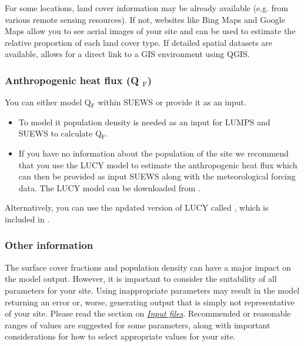 \documentclass[letterpaper,10pt,english]{sphinxmanual}
\begin{document}
For some locations, land cover information may be already available
(e.g. from various remote sensing resources). If not, websites like Bing
Maps and Google Maps allow you to see aerial images of your site and can
be used to estimate the relative proportion of each land cover type. If
detailed spatial datasets are available,
 allows for a direct link
to a GIS environment using QGIS.


\subsubsection{Anthropogenic heat flux (Q $_{\text{F}}$)}
\label{\detokenize{prepare-to-run-the-model:anthropogenic-heat-flux-qf-1}}\label{\detokenize{prepare-to-run-the-model:anthropogenic-heat-flux-q-f}}
You can either model Q$_{\text{F}}$ within SUEWS or provide it as an input.
\begin{itemize}
\item {} 
To model it population density is needed as an input for LUMPS and
SUEWS to calculate Q$_{\text{F}}$.

\item {} 
If you have no information about the population of the site we
recommend that you use the LUCY model \label{\detokenize{prepare-to-run-the-model:id8}}{\hyperref[\detokenize{references:lucy}]{\sphinxcrossref{{[}lucy{]}}}}  \label{\detokenize{prepare-to-run-the-model:id9}}{\hyperref[\detokenize{references:lucy2}]{\sphinxcrossref{{[}lucy2{]}}}} to estimate the
anthropogenic heat flux which can then be provided as input SUEWS
along with the meteorological forcing data. The LUCY model can be
downloaded from .

\end{itemize}

Alternatively, you can use the updated version of LUCY called
, which is included in
.


\subsubsection{Other information}
\label{\detokenize{prepare-to-run-the-model:other-information}}
The surface cover fractions and population density can have a major
impact on the model output. However, it is important to consider the
suitability of all parameters for your site. Using inappropriate
parameters may result in the model returning an error or, worse,
generating output that is simply not representative of your site. Please
read the section on {\hyperref[\detokenize{prepare-to-run-the-model:Input_files}]{\emph{Input files}}}. Recommended or
reasonable ranges of values are suggested for some parameters, along
with important considerations for how to select appropriate values for
your site.
\end{document}
